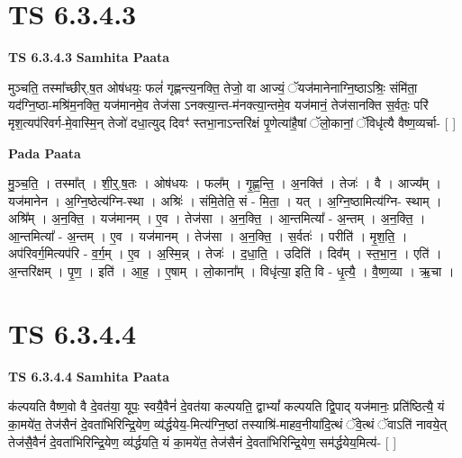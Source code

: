 \documentclass[17pt]{extarticle}
\begin{document}

\section{ TS 6.3.4.3 }

\textbf{TS 6.3.4.3 } \newline
\textbf{Samhita Paata} \newline

मुञ्चति॒ तस्मा᳚च्छीर्.ष॒त ओष॑धयः॒ फलं॑ गृह्णन्त्य॒नक्ति॒ तेजो॒ वा आज्यं॒ ॅयज॑मानेनाग्नि॒ष्ठाऽश्रिः॒ संमि॑ता॒ यद॑ग्नि॒ष्ठा-मश्रि॑म॒नक्ति॒ यज॑मानमे॒व तेज॑सा ऽनक्त्या॒न्त-म॑नक्त्या॒न्तमे॒व यज॑मानं॒ तेज॑सानक्ति स॒र्वतः॒ परि॑ मृश॒त्यप॑रिवर्ग-मे॒वास्मि॒न् तेजो॑ दधा॒त्युद् दिवꣳ॑ स्तभा॒नाऽन्तरि॑क्षं पृ॒णेत्या॑है॒षां ॅलो॒कानां॒ ॅविधृ॑त्यै वैष्ण॒व्यर्चा- [  ] \newline

\textbf{Pada Paata} \newline

मु॒ञ्च॒ति॒ । तस्मा᳚त् । शी॒र्॒.ष॒तः । ओष॑धयः । फल᳚म् । गृ॒ह्ण॒न्ति॒ । अ॒नक्ति॑ । तेजः॑ । वै । आज्य᳚म् । यज॑मानेन । अ॒ग्नि॒ष्ठेत्य॑ग्नि-स्था । अश्रिः॑ । संमि॒तेति॒ सं - मि॒ता॒ । यत् । अ॒ग्नि॒ष्ठामित्य॑ग्नि- स्थाम् । अश्रि᳚म् । अ॒न॒क्ति॒ । यज॑मानम् । ए॒व । तेज॑सा । अ॒न॒क्ति॒ । आ॒न्तमित्या᳚ - अ॒न्तम् । अ॒न॒क्ति॒ । आ॒न्तमित्या᳚ - अ॒न्तम् । ए॒व । यज॑मानम् । तेज॑सा । अ॒न॒क्ति॒ । स॒र्वतः॑ । परीति॑ । मृ॒श॒ति॒ । अप॑रिवर्ग॒मित्यप॑रि - व॒र्ग॒म् । ए॒व । अ॒स्मि॒न्न् । तेजः॑ । द॒धा॒ति॒ । उदिति॑ । दिव᳚म् । स्त॒भा॒न॒ । एति॑ । अ॒न्तरि॑क्षम् । पृ॒ण॒ । इति॑ । आ॒ह॒ । ए॒षाम् । लो॒काना᳚म् । विधृ॑त्या॒ इति॒ वि - धृ॒त्यै॒ । वै॒ष्ण॒व्या । ऋ॒चा ।  \newline





\section{ TS 6.3.4.4 }

\textbf{TS 6.3.4.4 } \newline
\textbf{Samhita Paata} \newline

क॑ल्पयति वैष्ण॒वो वै दे॒वत॑या॒ यूपः॒ स्वयै॒वैनं॑ दे॒वत॑या कल्पयति॒ द्वाभ्यां᳚ कल्पयति द्वि॒पाद् यज॑मानः॒ प्रति॑ष्ठित्यै॒ यं का॒मये॑त॒ तेज॑सैनं दे॒वता॑भिरिन्द्रि॒येण॒ व्य॑र्द्धयेय॒-मित्य॑ग्नि॒ष्ठां तस्याश्रि॑-माहव॒नीया॑दि॒त्थं ॅवे॒त्थं ॅवाऽति॑ नावये॒त् तेज॑सै॒वैनं॑ दे॒वता॑भिरिन्द्रि॒येण॒ व्य॑र्द्धयति॒ यं का॒मये॑त॒ तेज॑सैनं दे॒वता॑भिरिन्द्रि॒येण॒ सम॑र्द्धयेय॒मित्य॑- [  ] \newline
\end{document}
